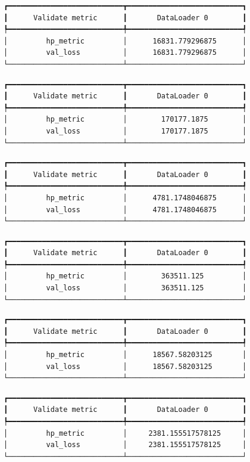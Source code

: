 \documentclass[
  letterpaper,
  DIV=11,
  numbers=noendperiod]{scrreprt}
\begin{document}
\begin{verbatim}
┏━━━━━━━━━━━━━━━━━━━━━━━━━━━┳━━━━━━━━━━━━━━━━━━━━━━━━━━━┓
┃      Validate metric      ┃       DataLoader 0        ┃
┡━━━━━━━━━━━━━━━━━━━━━━━━━━━╇━━━━━━━━━━━━━━━━━━━━━━━━━━━┩
│         hp_metric         │      16831.779296875      │
│         val_loss          │      16831.779296875      │
└───────────────────────────┴───────────────────────────┘
\end{verbatim}

\begin{verbatim}
┏━━━━━━━━━━━━━━━━━━━━━━━━━━━┳━━━━━━━━━━━━━━━━━━━━━━━━━━━┓
┃      Validate metric      ┃       DataLoader 0        ┃
┡━━━━━━━━━━━━━━━━━━━━━━━━━━━╇━━━━━━━━━━━━━━━━━━━━━━━━━━━┩
│         hp_metric         │        170177.1875        │
│         val_loss          │        170177.1875        │
└───────────────────────────┴───────────────────────────┘
\end{verbatim}

\begin{verbatim}
┏━━━━━━━━━━━━━━━━━━━━━━━━━━━┳━━━━━━━━━━━━━━━━━━━━━━━━━━━┓
┃      Validate metric      ┃       DataLoader 0        ┃
┡━━━━━━━━━━━━━━━━━━━━━━━━━━━╇━━━━━━━━━━━━━━━━━━━━━━━━━━━┩
│         hp_metric         │      4781.1748046875      │
│         val_loss          │      4781.1748046875      │
└───────────────────────────┴───────────────────────────┘
\end{verbatim}

\begin{verbatim}
┏━━━━━━━━━━━━━━━━━━━━━━━━━━━┳━━━━━━━━━━━━━━━━━━━━━━━━━━━┓
┃      Validate metric      ┃       DataLoader 0        ┃
┡━━━━━━━━━━━━━━━━━━━━━━━━━━━╇━━━━━━━━━━━━━━━━━━━━━━━━━━━┩
│         hp_metric         │        363511.125         │
│         val_loss          │        363511.125         │
└───────────────────────────┴───────────────────────────┘
\end{verbatim}

\begin{verbatim}
┏━━━━━━━━━━━━━━━━━━━━━━━━━━━┳━━━━━━━━━━━━━━━━━━━━━━━━━━━┓
┃      Validate metric      ┃       DataLoader 0        ┃
┡━━━━━━━━━━━━━━━━━━━━━━━━━━━╇━━━━━━━━━━━━━━━━━━━━━━━━━━━┩
│         hp_metric         │      18567.58203125       │
│         val_loss          │      18567.58203125       │
└───────────────────────────┴───────────────────────────┘
\end{verbatim}

\begin{verbatim}
┏━━━━━━━━━━━━━━━━━━━━━━━━━━━┳━━━━━━━━━━━━━━━━━━━━━━━━━━━┓
┃      Validate metric      ┃       DataLoader 0        ┃
┡━━━━━━━━━━━━━━━━━━━━━━━━━━━╇━━━━━━━━━━━━━━━━━━━━━━━━━━━┩
│         hp_metric         │     2381.155517578125     │
│         val_loss          │     2381.155517578125     │
└───────────────────────────┴───────────────────────────┘
\end{verbatim}
\end{document}
